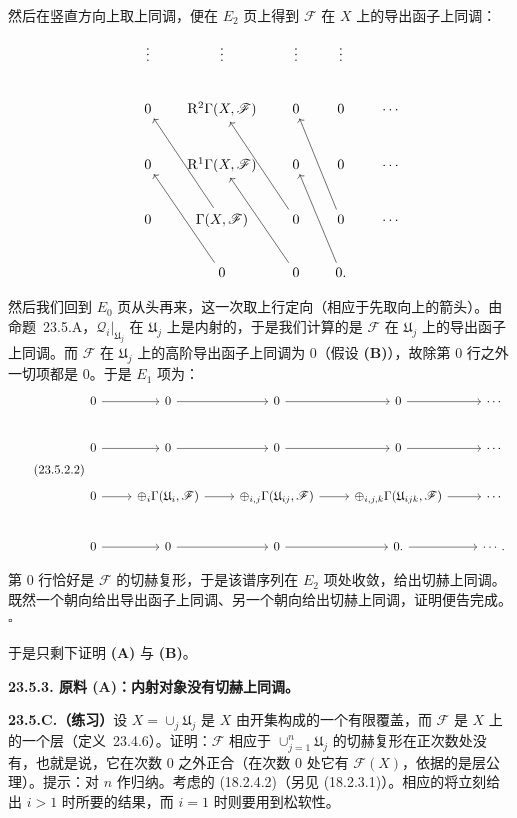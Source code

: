 然后在竖直方向上取上同调，便在 $E_2$ 页上得到 $\mathscr{F}$ 在 $X$ 上的导出函子上同调：
\[
\begin{tikzcd}[row sep=2.2em, column sep=1.7em]
 & \vdots & \vdots & \vdots & \vdots & \\
 & 0 & \mathrm{R}^2\Gamma(X,\mathscr{F}) & 0 & 0 & \cdots \\
 & 0 & \mathrm{R}^1\Gamma(X,\mathscr{F}) & 0 & 0 & \cdots \\
 & 0 & \Gamma(X,\mathscr{F}) \ar[uul] & 0 \ar[uul] & 0 \ar[uul] & \cdots \\
 & & 0 \ar[uul] & 0 \ar[uul] & 0. \ar[uul] &
\end{tikzcd}
\]

然后我们回到 $E_0$ 页从头再来，这一次取上行定向（相应于先取向上的箭头）。由\mbox{命题~23.5.A}，$\mathscr{Q}_i|_{\mathfrak{U}_j}$ 在 $\mathfrak{U}_j$ 上是内射的，于是我们计算的是 $\mathscr{F}$ 在 $\mathfrak{U}_j$ 上的导出函子上同调。而 $\mathscr{F}$ 在 $\mathfrak{U}_j$ 上的高阶导出函子上同调为 $0$（假设 \textbf{(B)}），故除第 $0$ 行之外一切项都是 $0$。于是 $E_1$ 项为：
\begin{equation*}\tag{23.5.2.2}\label{eq:agree-e1}
\begin{tikzcd}[row sep=2.4em, column sep=2.4em]
0 \ar[r] & 0 \ar[r] & 0 \ar[r] & 0 \ar[r] & \cdots \\
0 \ar[r] & 0 \ar[r] & 0 \ar[r] & 0 \ar[r] & \cdots \\
0 \ar[r] & \oplus_i\Gamma(\mathfrak{U}_i,\mathscr{F}) \ar[r] & \oplus_{i,j}\Gamma(\mathfrak{U}_{ij},\mathscr{F}) \ar[r] & \oplus_{i,j,k}\Gamma(\mathfrak{U}_{ijk},\mathscr{F}) \ar[r] & \cdots \\
0 \ar[r] & 0 \ar[r] & 0 \ar[r] & 0. \ar[r] & \cdots.
\end{tikzcd}
\end{equation*}

第 $0$ 行恰好是 $\mathscr{F}$ 的切赫复形，于是该谱序列在 $E_2$ 项处收敛，给出切赫上同调。既然一个朝向给出导出函子上同调、另一个朝向给出切赫上同调，证明便告完成。\hfill$\square$

于是只剩下证明 \textbf{(A)} 与 \textbf{(B)}。

\textbf{23.5.3. 原料 (A)：内射对象没有切赫上同调。}\quad

\textbf{23.5.C.（练习）}\quad 设 $X=\cup_j\mathfrak{U}_j$ 是 $X$ 由开集构成的一个有限覆盖，而 $\mathscr{F}$ 是 $X$ 上的一个\trFlasque{}层（\mbox{定义~23.4.6}）。证明：$\mathscr{F}$ 相应于 $\cup_{j=1}^n\mathfrak{U}_j$ 的切赫复形在正次数处没有\trCohomology，也就是说，它在次数 $0$ 之外正合（在次数 $0$ 处它有\trCohomology{} $\mathscr{F}(X)$，依据的是层公理）。提示：对 $n$ 作归纳。考虑\trComplexes{}的\trShortExactSequence{} \mbox{(18.2.4.2)}（另见 \mbox{(18.2.3.1)}）。相应的\trLongExactSequence{}将立刻给出 $i>1$ 时所要的结果，而 $i=1$ 时则要用到松软性。

